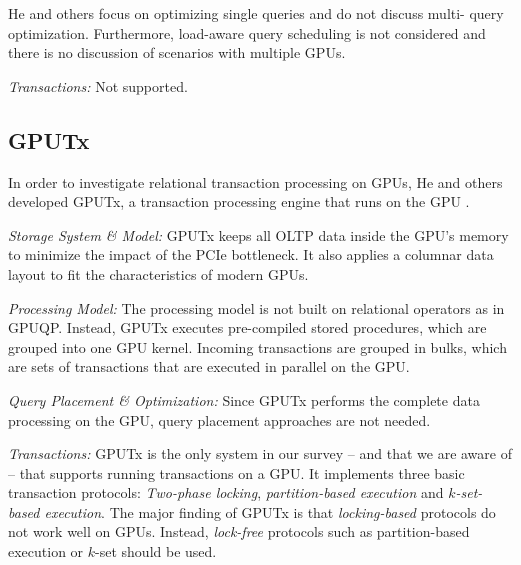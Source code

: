 \documentclass[twocolumn]{article}
\begin{document}
He and others focus on optimizing single queries and do not discuss multi- query optimization. Furthermore, load-aware query scheduling is not considered and there is no discussion of scenarios with multiple GPUs.

\noindent
\textit{Transactions:} Not supported.

\subsection{GPUTx}
In order to investigate relational transaction processing on GPUs, He and others developed GPUTx, a transaction processing engine that runs on the GPU \cite{He:2011}.

\noindent
\textit{Storage System \& Model:}
GPUTx keeps all OLTP data inside the GPU’s memory to minimize the impact of the PCIe bottleneck. 
It also applies a columnar data layout to fit the characteristics of modern GPUs.

\noindent
\textit{Processing Model:} The processing model is not built on relational operators as in GPUQP. Instead, GPUTx executes pre-compiled stored procedures, which are grouped into one GPU kernel. Incoming transactions are grouped in bulks, which are sets of transactions that are executed in parallel on the GPU.

\noindent
\textit{Query Placement \& Optimization:}
Since GPUTx performs the complete data processing on the GPU, query placement approaches are not needed.

\noindent
\textit{Transactions:}
GPUTx is the only system in our survey – and that we are aware of – that supports running transactions on a GPU. It implements three basic transaction protocols: \textit{Two-phase locking}, \textit{partition-based execution} and $k$\textit{-set- based execution}. The major finding of GPUTx is that \textit{locking-based} protocols do not work well on GPUs. 
Instead, \textit{lock-free} protocols such as partition-based execution or $k$-set should be used.
\end{document}
